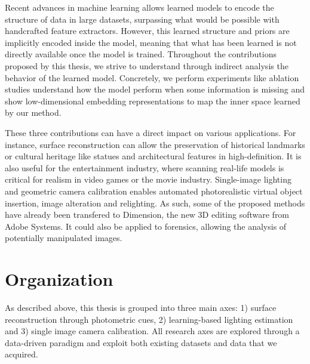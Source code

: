 Recent advances in machine learning allows learned models to encode the structure of data in large datasets, surpassing what would be possible with handcrafted feature extractors. However, this learned structure and priors are implicitly encoded inside the model, meaning that what has been learned is not directly available once the model is trained. Throughout the contributions proposed by this thesis, we strive to understand through indirect analysis the behavior of the learned model. Concretely, we perform experiments like ablation studies understand how the model perform when some information is missing and show low-dimensional embedding representations to map the inner space learned by our method. 


These three contributions can have a direct impact on various applications. For instance, surface reconstruction can allow the preservation of historical landmarks or cultural heritage like statues and architectural features in high-definition. It is also useful for the entertainment industry, where scanning real-life models is critical for realism in video games or the movie industry. Single-image lighting and geometric camera calibration enables automated photorealistic virtual object insertion, image alteration and relighting. As such, some of the proposed methods have already been transfered to Dimension, the new 3D editing software from Adobe Systems. It could also be applied to forensics, allowing the analysis of potentially manipulated images. 

\section*{Organization}

As described above, this thesis is grouped into three main axes: 1) surface reconstruction through photometric cues, 2) learning-based lighting estimation and 3) single image camera calibration. All research axes are explored through a data-driven paradigm and exploit both existing datasets and data that we acquired. 

